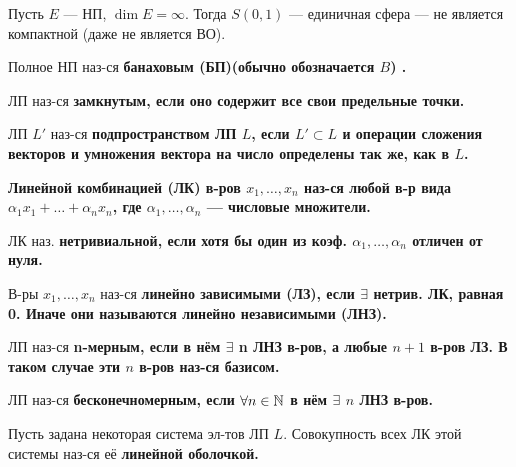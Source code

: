 \begin{thm}[4.1, Рисс]
Пусть $E$ --- НП, $\dim E = \infty$. Тогда $S(0, 1)$ --- единичная сфера --- не является компактной (даже не является ВО).
\end{thm}

\begin{defn}
Полное НП наз-ся \bf{банаховым (БП)}(обычно обозначается $B$) .
\end{defn}

\begin{defn}
ЛП наз-ся \bf{замкнутым}, если оно содержит все свои предельные точки.
\end{defn}

\begin{defn}
ЛП $L'$ наз-ся \bf{подпространством} ЛП $L$, если $L' \subset L$ и операции сложения векторов и умножения вектора на число определены так же, как в $L$.
\end{defn}

\begin{defn}
\bf{Линейной комбинацией (ЛК)} в-ров $x_1, \dots, x_n$ наз-ся любой в-р вида $\alpha_1 x_1 + \dots + \alpha_n x_n$, где $\alpha_1, \dots, \alpha_n$ --- числовые множители.
\end{defn}

\begin{defn}
ЛК наз. \bf{нетривиальной}, если хотя бы один из коэф. $\alpha_1, \dots, \alpha_n$ отличен от нуля.
\end{defn}

\begin{defn}
В-ры $x_1, \dots, x_n$ наз-ся \bf{линейно зависимыми (ЛЗ)}, если $\exists$ нетрив. ЛК, равная 0. Иначе они называются \bf{линейно независимыми (ЛНЗ)}.
\end{defn}

\begin{defn}
ЛП наз-ся \bf{n-мерным}, если в нём $\exists$ n ЛНЗ в-ров, а любые $n+1$ в-ров ЛЗ. В таком случае эти $n$ в-ров наз-ся базисом.
\end{defn}

\begin{defn}
ЛП наз-ся \bf{бесконечномерным}, если $\forall n \in \mathbb{N}$ в нём $\exists$ $n$ ЛНЗ в-ров.
\end{defn}

\begin{defn}
Пусть задана некоторая система эл-тов ЛП $L$. Совокупность всех ЛК этой системы наз-ся её \bf{линейной оболочкой}.
\end{defn}

